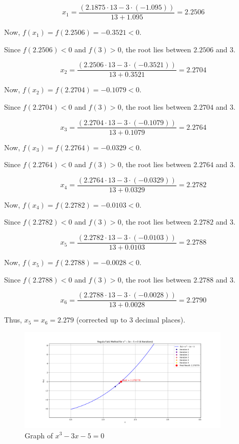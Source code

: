 \documentclass[12pt,a4paper]{article}
\begin{document}
	\[
	x_1 = \frac{(2.1875 \cdot 13 - 3 \cdot (-1.095))}{13 + 1.095} = 2.2506
	\]
	
	Now, $f(x_1) = f(2.2506) = -0.3521 < 0$.
	
	Since $f(2.2506) < 0$ and $f(3) > 0$, the root lies between $2.2506$ and $3$.
	
	\[
	x_2 = \frac{(2.2506 \cdot 13 - 3 \cdot (-0.3521))}{13 + 0.3521} = 2.2704
	\]
	
	Now, $f(x_2) = f(2.2704) = -0.1079 < 0$.
	
	Since $f(2.2704) < 0$ and $f(3) > 0$, the root lies between $2.2704$ and $3$.
	
	\[
	x_3 = \frac{(2.2704 \cdot 13 - 3 \cdot (-0.1079))}{13 + 0.1079} = 2.2764
	\]
	
	Now, $f(x_3) = f(2.2764) = -0.0329 < 0$.
	
	Since $f(2.2764) < 0$ and $f(3) > 0$, the root lies between $2.2764$ and $3$.
	
	\[
	x_4 = \frac{(2.2764 \cdot 13 - 3 \cdot (-0.0329))}{13 + 0.0329} = 2.2782
	\]
	
	Now, $f(x_4) = f(2.2782) = -0.0103 < 0$.
	
	Since $f(2.2782) < 0$ and $f(3) > 0$, the root lies between $2.2782$ and $3$.
	
	\[
	x_5 = \frac{(2.2782 \cdot 13 - 3 \cdot (-0.0103))}{13 + 0.0103} = 2.2788
	\]
	
	Now, $f(x_5) = f(2.2788) = -0.0028 < 0$.
	
	Since $f(2.2788) < 0$ and $f(3) > 0$, the root lies between $2.2788$ and $3$.
	
	\[
	x_6 = \frac{(2.2788 \cdot 13 - 3 \cdot (-0.0028))}{13 + 0.0028} = 2.2790
	\]
	
	Thus, $x_5 = x_6 = 2.279$ (corrected up to 3 decimal places).
	
	\begin{figure}[h]
		\centering
		\includegraphics[width=0.9\textwidth]{regula_falsi_ex2.png} %
		\caption{Graph of $x^3-3x-5=0$}
		\label{fig:your_label_here}
	\end{figure} 
	
\end{document}
